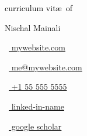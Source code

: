 \begin{scriptsize}
	 \textcolor{black}{curriculum vit\ae~of}
\end{scriptsize}

\vspace*{0.17em}
\begin{huge} 
	Nischal Mainali
\end{huge}

		  
\vspace*{0.4cm}

\begin{footnotesize}
	\begin{tiny}\faHome\end{tiny}~\href{https://google.com}{
		mywebsite.com
	}
	\quad \begin{tiny}\faEnvelope[regular]\end{tiny}~\href{mailto:me@mywebsite.com}{%
		me@mywebsite.com
	} 
	
	\begin{tiny}\faMobile*\end{tiny}~\href{tel:001555555555}{
		+1 55 555 5555
	} 
	\quad 
	\begin{tiny}\faLinkedinIn\end{tiny}~\href{https://www.linkedin.com/in/MYLINK/}{
		linked-in-name
	}
	\quad 
	\begin{tiny}\faGraduationCap\end{tiny}~\href{https://scholar.google.com/citations?user=USERID&hl=en}{
		 google scholar
		}

\end{footnotesize}